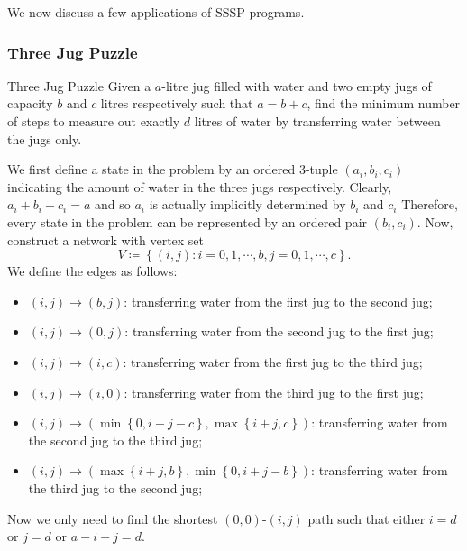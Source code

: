\documentclass[math, code]{amznotes}
\theoremstyle{remark}
\begin{document}
We now discuss a few applications of SSSP programs.
\subsubsection{Three Jug Puzzle}
\begin{genbox}{Three Jug Puzzle}
    Given a $a$-litre jug filled with water and two empty jugs of capacity $b$ and $c$ litres respectively such that $a = b + c$, find the minimum number of steps to measure out exactly $d$ litres of water by transferring water between the jugs only.
\end{genbox}
We first define a state in the problem by an ordered $3$-tuple $(a_i, b_i, c_i)$ indicating the amount of water in the three jugs respectively. Clearly, $a_i + b_i + c_i = a$ and so $a_i$ is actually implicitly determined by $b_i$ and $c_i$ Therefore, every state in the problem can be represented by an ordered pair $(b_i, c_i)$. Now, construct a network with vertex set
\begin{equation*}
    V \coloneqq \left\{(i, j) \colon i = 0, 1, \cdots, b, j = 0, 1, \cdots, c\right\}.
\end{equation*}
We define the edges as follows:
\begin{itemize}
    \item $(i, j) \to (b, j)$: transferring water from the first jug to the second jug;
    \item $(i, j) \to (0, j)$: transferring water from the second jug to the first jug;
    \item $(i, j) \to (i, c)$: transferring water from the first jug to the third jug;
    \item $(i, j) \to (i, 0)$: transferring water from the third jug to the first jug;
    \item $(i, j) \to \left(\min\left\{0, i + j - c\right\}, \max\left\{i + j, c\right\}\right)$: transferring water from the second jug to the third jug;
    \item $(i, j) \to \left(\max\left\{i + j, b\right\}, \min\left\{0, i + j - b\right\}\right)$: transferring water from the third jug to the second jug;
\end{itemize}
Now we only need to find the shortest $(0, 0)$-$(i, j)$ path such that either $i = d$ or $j = d$ or $a - i - j = d$.
\end{document}
